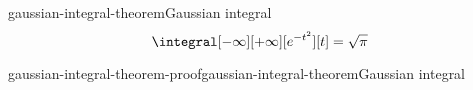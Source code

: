 \documentclass[preview]{standalone}
\begin{document}
\genpage

\begin{snippettheorem}{gaussian-integral-theorem}{Gaussian integral}
    \[
        \integral[-\infty][+\infty][e^{-t^2}][t] = \sqrt{\pi}
    \]
\end{snippettheorem}

\begin{snippetproof}{gaussian-integral-theorem-proof}{gaussian-integral-theorem}{Gaussian integral}
    \todo
\end{snippetproof}
\end{document}
